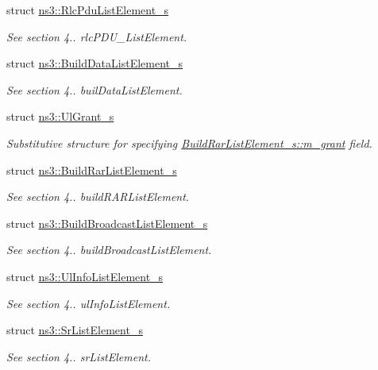 \begin{DoxyCompactItemize}
struct \hyperlink{structns3_1_1RlcPduListElement__s}{ns3\+::\+Rlc\+Pdu\+List\+Element\+\_\+s}
\begin{DoxyCompactList}\small\item\em See section 4.. rlc\+P\+D\+U\+\_\+\+List\+Element. \end{DoxyCompactList}\item 
struct \hyperlink{structns3_1_1BuildDataListElement__s}{ns3\+::\+Build\+Data\+List\+Element\+\_\+s}
\begin{DoxyCompactList}\small\item\em See section 4.. buil\+Data\+List\+Element. \end{DoxyCompactList}\item 
struct \hyperlink{structns3_1_1UlGrant__s}{ns3\+::\+Ul\+Grant\+\_\+s}
\begin{DoxyCompactList}\small\item\em Substitutive structure for specifying \hyperlink{structns3_1_1BuildRarListElement__s_acd5001d775fe5373d8f5a946faf9eab4}{Build\+Rar\+List\+Element\+\_\+s\+::m\+\_\+grant} field. \end{DoxyCompactList}\item 
struct \hyperlink{structns3_1_1BuildRarListElement__s}{ns3\+::\+Build\+Rar\+List\+Element\+\_\+s}
\begin{DoxyCompactList}\small\item\em See section 4.. build\+R\+A\+R\+List\+Element. \end{DoxyCompactList}\item 
struct \hyperlink{structns3_1_1BuildBroadcastListElement__s}{ns3\+::\+Build\+Broadcast\+List\+Element\+\_\+s}
\begin{DoxyCompactList}\small\item\em See section 4.. build\+Broadcast\+List\+Element. \end{DoxyCompactList}\item 
struct \hyperlink{structns3_1_1UlInfoListElement__s}{ns3\+::\+Ul\+Info\+List\+Element\+\_\+s}
\begin{DoxyCompactList}\small\item\em See section 4.. ul\+Info\+List\+Element. \end{DoxyCompactList}\item 
struct \hyperlink{structns3_1_1SrListElement__s}{ns3\+::\+Sr\+List\+Element\+\_\+s}
\begin{DoxyCompactList}\small\item\em See section 4.. sr\+List\+Element. \end{DoxyCompactList}\item 

\end{DoxyCompactItemize}

